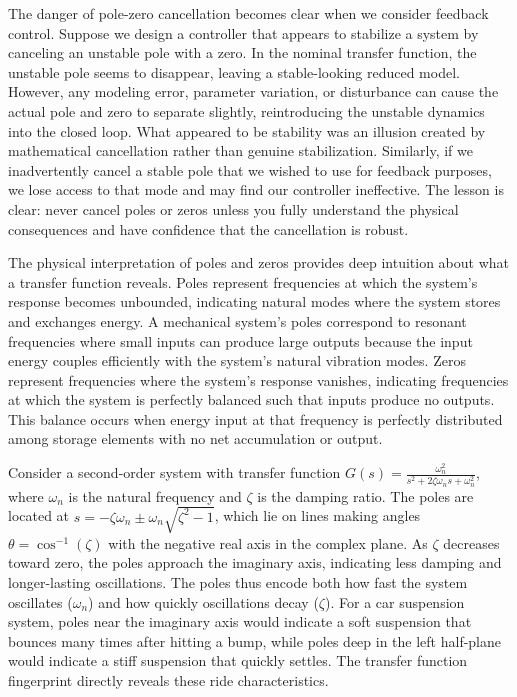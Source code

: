 The danger of pole-zero cancellation becomes clear when we consider feedback control. Suppose we design a controller that appears to stabilize a system by canceling an unstable pole with a zero. In the nominal transfer function, the unstable pole seems to disappear, leaving a stable-looking reduced model. However, any modeling error, parameter variation, or disturbance can cause the actual pole and zero to separate slightly, reintroducing the unstable dynamics into the closed loop. What appeared to be stability was an illusion created by mathematical cancellation rather than genuine stabilization. Similarly, if we inadvertently cancel a stable pole that we wished to use for feedback purposes, we lose access to that mode and may find our controller ineffective. The lesson is clear: never cancel poles or zeros unless you fully understand the physical consequences and have confidence that the cancellation is robust.

The physical interpretation of poles and zeros provides deep intuition about what a transfer function reveals. Poles represent frequencies at which the system's response becomes unbounded, indicating natural modes where the system stores and exchanges energy. A mechanical system's poles correspond to resonant frequencies where small inputs can produce large outputs because the input energy couples efficiently with the system's natural vibration modes. Zeros represent frequencies where the system's response vanishes, indicating frequencies at which the system is perfectly balanced such that inputs produce no outputs. This balance occurs when energy input at that frequency is perfectly distributed among storage elements with no net accumulation or output.

Consider a second-order system with transfer function $G(s) = \frac{\omega_n^2}{s^2 + 2\zeta\omega_n s + \omega_n^2}$, where $\omega_n$ is the natural frequency and $\zeta$ is the damping ratio. The poles are located at $s = -\zeta\omega_n \pm \omega_n\sqrt{\zeta^2-1}$, which lie on lines making angles $\theta = \cos^{-1}(\zeta)$ with the negative real axis in the complex plane. As $\zeta$ decreases toward zero, the poles approach the imaginary axis, indicating less damping and longer-lasting oscillations. The poles thus encode both how fast the system oscillates ($\omega_n$) and how quickly oscillations decay ($\zeta$). For a car suspension system, poles near the imaginary axis would indicate a soft suspension that bounces many times after hitting a bump, while poles deep in the left half-plane would indicate a stiff suspension that quickly settles. The transfer function fingerprint directly reveals these ride characteristics.

